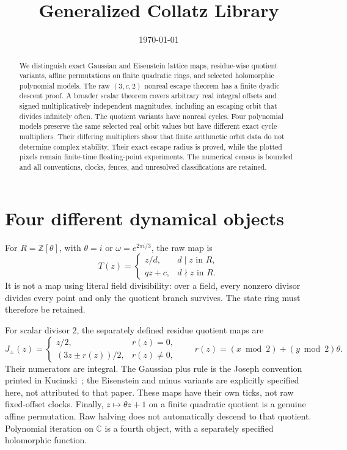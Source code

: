 \documentclass[11pt,letterpaper]{article}
\title{Generalized Collatz Library}
\author{}
\date{\today}
\newcommand{\Z}{\mathbb{Z}}
\newcommand{\C}{\mathbb{C}}
\begin{document}
\maketitle

\begin{abstract}
We distinguish exact Gaussian and Eisenstein lattice maps, residue-wise
quotient variants, affine permutations on finite quadratic rings, and
selected holomorphic polynomial models. The raw \((3,c,2)\) nonreal escape theorem has a finite dyadic descent proof. A broader scalar theorem covers arbitrary real integral offsets and signed multiplicatively independent magnitudes, including an escaping orbit that divides infinitely often. The quotient variants have nonreal cycles. Four polynomial models preserve the same selected real orbit values but have different exact cycle multipliers. Their differing multipliers show that finite arithmetic orbit data do
not determine complex stability. Their exact escape radius is proved, while the plotted pixels remain finite-time floating-point experiments. The numerical census is bounded and all conventions, clocks, fences, and unresolved classifications are retained.
\end{abstract}

\section{Four different dynamical objects}

For \(R=\Z[\theta]\), with \(\theta=i\) or \(\omega=e^{2\pi i/3}\), the raw map is
\[
T(z)=\begin{cases}z/d,&d\mid z\text{ in }R,\\qz+c,&d\nmid z\text{ in }R.\end{cases}
\]
It is not a map using literal field divisibility: over a field, every nonzero divisor divides every point and only the quotient branch survives. The state ring must therefore be retained.

For scalar divisor \(2\), the separately defined residue quotient maps are
\[
J_\pm(z)=\begin{cases}z/2,&r(z)=0,\\(3z\pm r(z))/2,&r(z)\ne0,\end{cases}
\qquad r(z)=(x\bmod2)+(y\bmod2)\theta.
\]
Their numerators are integral. The Gaussian plus rule is the Joseph convention printed in Kucinski~\cite{Kucinski00}; the Eisenstein and minus variants are explicitly specified here, not attributed to that paper. These maps have their own ticks, not raw fixed-offset clocks. Finally, \(z\mapsto\theta z+1\) on a finite quadratic quotient is a genuine affine permutation. Raw halving does not automatically descend to that quotient. Polynomial iteration on \(\C\) is a fourth object, with a separately specified holomorphic function.
\end{document}
